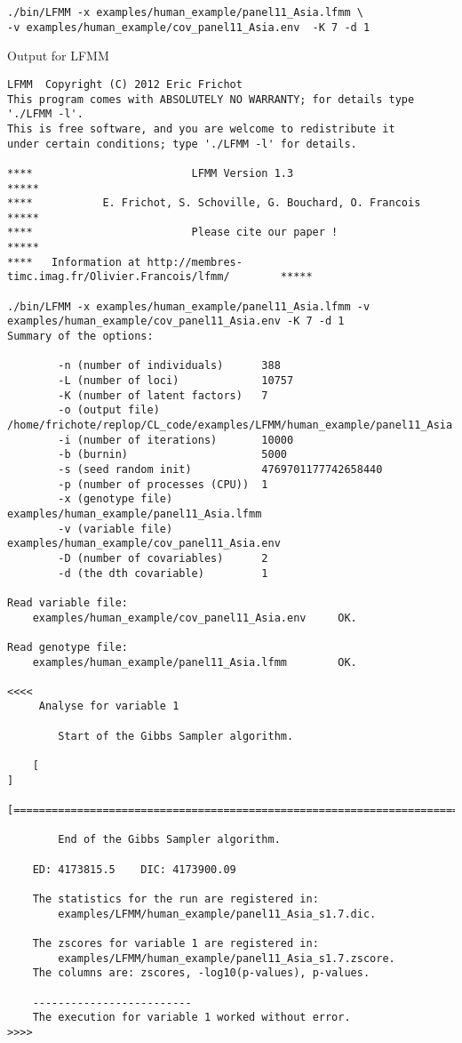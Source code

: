 \documentclass[10pt,a4paper]{article}
\begin{document}
\begin{Verbatim}[frame=single]
./bin/LFMM -x examples/human_example/panel11_Asia.lfmm \ 
-v examples/human_example/cov_panel11_Asia.env  -K 7 -d 1 
\end{Verbatim}
Output for LFMM
\begin{Verbatim}[frame=single]
LFMM  Copyright (C) 2012 Eric Frichot
This program comes with ABSOLUTELY NO WARRANTY; for details type './LFMM -l'.
This is free software, and you are welcome to redistribute it
under certain conditions; type './LFMM -l' for details.

****                         LFMM Version 1.3                                   *****
****           E. Frichot, S. Schoville, G. Bouchard, O. Francois               *****
****                         Please cite our paper !                            *****
****   Information at http://membres-timc.imag.fr/Olivier.Francois/lfmm/        *****

./bin/LFMM -x examples/human_example/panel11_Asia.lfmm -v examples/human_example/cov_panel11_Asia.env -K 7 -d 1  
Summary of the options:

        -n (number of individuals)      388
        -L (number of loci)             10757
        -K (number of latent factors)   7
        -o (output file)                /home/frichote/replop/CL_code/examples/LFMM/human_example/panel11_Asia
        -i (number of iterations)       10000
        -b (burnin)                     5000
        -s (seed random init)           4769701177742658440
        -p (number of processes (CPU))  1
        -x (genotype file)              examples/human_example/panel11_Asia.lfmm
        -v (variable file)              examples/human_example/cov_panel11_Asia.env
        -D (number of covariables)      2
        -d (the dth covariable)         1

Read variable file:
 	examples/human_example/cov_panel11_Asia.env		OK.

Read genotype file:
 	examples/human_example/panel11_Asia.lfmm		OK.

<<<<
	 Analyse for variable 1

		Start of the Gibbs Sampler algorithm.

	[                                                                           ]
	[===========================================================================]

		End of the Gibbs Sampler algorithm.

	ED: 4173815.5	 DIC: 4173900.09 

	The statistics for the run are registered in:
 		examples/LFMM/human_example/panel11_Asia_s1.7.dic.

	The zscores for variable 1 are registered in:
 		examples/LFMM/human_example/panel11_Asia_s1.7.zscore.
	The columns are: zscores, -log10(p-values), p-values.

	-------------------------
	The execution for variable 1 worked without error.
>>>>
\end{Verbatim}
\end{document}
